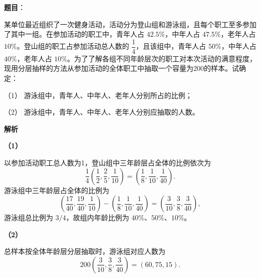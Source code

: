 \begin{answer}

\textbf{题目}：

某单位最近组织了一次健身活动，活动分为登山组和游泳组，且每个职工至多参加了其中一组。在参加活动的职工中，青年人占 $42.5\%$，中年人占 $47.5\%$，老年人占 $10\%$。登山组的职工占参加活动总人数的 $\dfrac14$，且该组中，青年人占 $50\%$，中年人占 $40\%$，老年人占 $10\%$。为了了解各组不同年龄层次的职工对本次活动的满意程度，现用分层抽样的方法从参加活动的全体职工中抽取一个容量为200的样本。试确定：

（1） 游泳组中，青年人、中年人、老年人分别所占的比例；

（2） 游泳组中，青年人、中年人、老年人分别应抽取的人数。

\textbf{解析}

\textbf{（1）}

以参加活动职工总人数为1，登山组中三年龄层占全体的比例依次为
\nopagebreak[4]
\[
\frac14\left(\frac12,\frac25,\frac1{10}\right)=\left(\frac18,\frac1{10},\frac1{40}\right).
\]
游泳组中三年龄层占全体的比例为
\nopagebreak[4]
\[
\left(\frac{17}{40},\frac{19}{40},\frac1{10}\right)
-\left(\frac18,\frac1{10},\frac1{40}\right)
=\left(\frac3{10},\frac38,\frac3{40}\right),
\]
游泳组总比例为 $3/4$，故组内年龄比例为 $40\%\text{、}50\%\text{、}10\%$。

\textbf{（2）}

总样本按全体年龄层分层抽取时，游泳组对应人数为
\nopagebreak[4]
\[
200\left(\frac3{10},\frac38,\frac3{40}\right)=(60,75,15).
\]



\end{answer}
